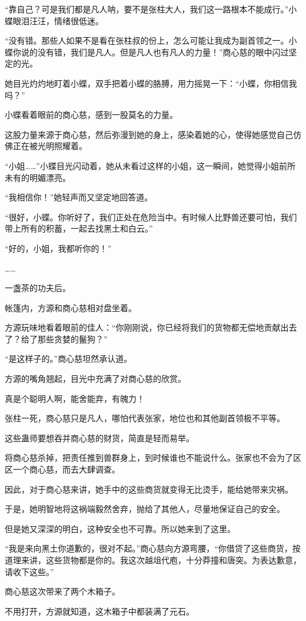 \begin{this_body}
“靠自己？可是我们都是凡人呐，要不是张柱大人，我们这一路根本不能成行。”小蝶眼泪汪汪，情绪很低迷。

“没有错。那些人如果不是看在张柱叔的份上，怎么可能让我成为副首领之一。小蝶你说的没有错，我们是凡人。但是凡人也有凡人的力量！”商心慈的眼中闪过坚定的光。

她目光灼灼地盯着小蝶，双手把着小蝶的胳膊，用力摇晃一下：“小蝶，你相信我吗？”

小蝶看着眼前的商心慈，感到一股莫名的力量。

这股力量来源于商心慈，然后弥漫到她的身上，感染着她的心，使得她感觉自己仿佛正在被光明照耀着。

“小姐……”小蝶目光闪动着，她从未看过这样的小姐，这一瞬间，她觉得小姐前所未有的明媚漂亮。

“我相信你！”她轻声而又坚定地回答道。

“很好，小蝶。你听好了，我们正处在危险当中。有时候人比野兽还要可怕，我们带上所有的积蓄，一起去找黑土和白云。”

“好的，小姐，我都听你的！”

……

一盏茶的功夫后。

帐篷内，方源和商心慈相对盘坐着。

方源玩味地看着眼前的佳人：“你刚刚说，你已经将我们的货物都无偿地贡献出去了？给了那些贪婪的鬣狗？”

“是这样子的。”商心慈坦然承认道。

方源的嘴角翘起，目光中充满了对商心慈的欣赏。

真是个聪明人啊，能舍能弃，有魄力！

张柱一死，商心慈只是凡人，哪怕代表张家，地位也和其他副首领极不平等。

这些蛊师要想吞并商心慈的财货，简直是轻而易举。

将商心慈杀掉，把责任推到兽群身上，到时候谁也不能说什么。张家也不会为了区区一个商心慈，而去大肆调查。

因此，对于商心慈来讲，她手中的这些商货就变得无比烫手，能给她带来灾祸。

于是，她明智地将这祸端毅然舍弃，抛给了其他人，尽量地保证自己的安全。

但是她又深深的明白，这种安全也不可靠。所以她来到了这里。

“我是来向黑土你道歉的，很对不起。”商心慈向方源弯腰，“你借贷了这些商货，按道理来讲，这些货物都是你的。我这次越俎代庖，十分莽撞和唐突。为表达歉意，请收下这些。”

商心慈这次带来了两个木箱子。

不用打开，方源就知道，这木箱子中都装满了元石。


\end{this_body}
